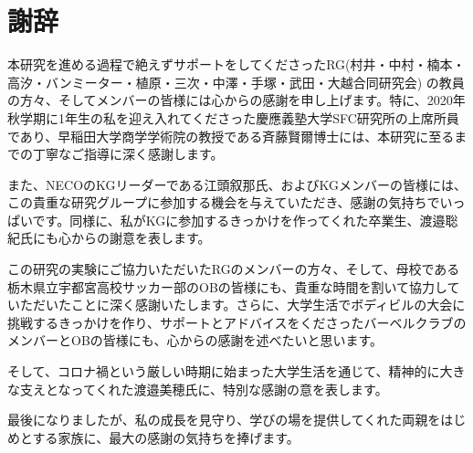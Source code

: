 \chapter*{謝辞}
\label{thanks}

本研究を進める過程で絶えずサポートをしてくださったRG(村井・中村・楠本・高汐・バンミーター・植原・三次・中澤・手塚・武田・大越合同研究会) の教員の方々、そしてメンバーの皆様には心からの感謝を申し上げます。特に、2020年秋学期に1年生の私を迎え入れてくださった慶應義塾大学SFC研究所の上席所員であり、早稲田大学商学学術院の教授である斉藤賢爾博士には、本研究に至るまでの丁寧なご指導に深く感謝します。

また、NECOのKGリーダーである江頭叙那氏、およびKGメンバーの皆様には、この貴重な研究グループに参加する機会を与えていただき、感謝の気持ちでいっぱいです。同様に、私がKGに参加するきっかけを作ってくれた卒業生、渡邉聡紀氏にも心からの謝意を表します。

この研究の実験にご協力いただいたRGのメンバーの方々、そして、母校である栃木県立宇都宮高校サッカー部のOBの皆様にも、貴重な時間を割いて協力していただいたことに深く感謝いたします。さらに、大学生活でボディビルの大会に挑戦するきっかけを作り、サポートとアドバイスをくださったバーベルクラブのメンバーとOBの皆様にも、心からの感謝を述べたいと思います。

そして、コロナ禍という厳しい時期に始まった大学生活を通じて、精神的に大きな支えとなってくれた渡邉美穂氏に、特別な感謝の意を表します。

最後になりましたが、私の成長を見守り、学びの場を提供してくれた両親をはじめとする家族に、最大の感謝の気持ちを捧げます。



